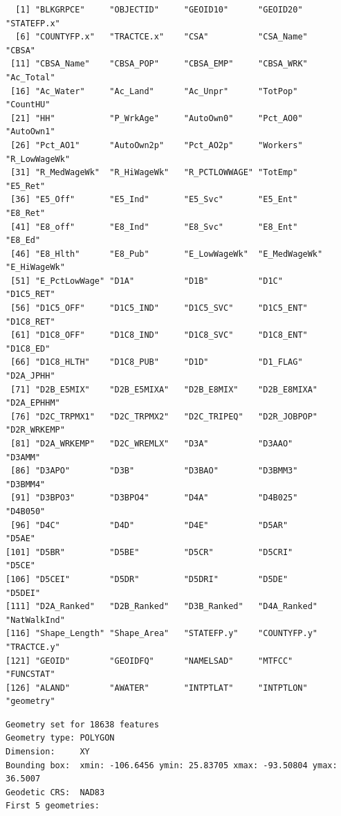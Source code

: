 \documentclass[
  letterpaper,
  DIV=11,
  numbers=noendperiod]{scrartcl}
\newenvironment{Shaded}{\begin{snugshade}}{\end{snugshade}}
\newcommand{\NormalTok}[1]{\textcolor[rgb]{0.00,0.23,0.31}{#1}}
\newcommand{\SpecialCharTok}[1]{\textcolor[rgb]{0.37,0.37,0.37}{#1}}
\begin{document}
\begin{verbatim}
  [1] "BLKGRPCE"     "OBJECTID"     "GEOID10"      "GEOID20"      "STATEFP.x"   
  [6] "COUNTYFP.x"   "TRACTCE.x"    "CSA"          "CSA_Name"     "CBSA"        
 [11] "CBSA_Name"    "CBSA_POP"     "CBSA_EMP"     "CBSA_WRK"     "Ac_Total"    
 [16] "Ac_Water"     "Ac_Land"      "Ac_Unpr"      "TotPop"       "CountHU"     
 [21] "HH"           "P_WrkAge"     "AutoOwn0"     "Pct_AO0"      "AutoOwn1"    
 [26] "Pct_AO1"      "AutoOwn2p"    "Pct_AO2p"     "Workers"      "R_LowWageWk" 
 [31] "R_MedWageWk"  "R_HiWageWk"   "R_PCTLOWWAGE" "TotEmp"       "E5_Ret"      
 [36] "E5_Off"       "E5_Ind"       "E5_Svc"       "E5_Ent"       "E8_Ret"      
 [41] "E8_off"       "E8_Ind"       "E8_Svc"       "E8_Ent"       "E8_Ed"       
 [46] "E8_Hlth"      "E8_Pub"       "E_LowWageWk"  "E_MedWageWk"  "E_HiWageWk"  
 [51] "E_PctLowWage" "D1A"          "D1B"          "D1C"          "D1C5_RET"    
 [56] "D1C5_OFF"     "D1C5_IND"     "D1C5_SVC"     "D1C5_ENT"     "D1C8_RET"    
 [61] "D1C8_OFF"     "D1C8_IND"     "D1C8_SVC"     "D1C8_ENT"     "D1C8_ED"     
 [66] "D1C8_HLTH"    "D1C8_PUB"     "D1D"          "D1_FLAG"      "D2A_JPHH"    
 [71] "D2B_E5MIX"    "D2B_E5MIXA"   "D2B_E8MIX"    "D2B_E8MIXA"   "D2A_EPHHM"   
 [76] "D2C_TRPMX1"   "D2C_TRPMX2"   "D2C_TRIPEQ"   "D2R_JOBPOP"   "D2R_WRKEMP"  
 [81] "D2A_WRKEMP"   "D2C_WREMLX"   "D3A"          "D3AAO"        "D3AMM"       
 [86] "D3APO"        "D3B"          "D3BAO"        "D3BMM3"       "D3BMM4"      
 [91] "D3BPO3"       "D3BPO4"       "D4A"          "D4B025"       "D4B050"      
 [96] "D4C"          "D4D"          "D4E"          "D5AR"         "D5AE"        
[101] "D5BR"         "D5BE"         "D5CR"         "D5CRI"        "D5CE"        
[106] "D5CEI"        "D5DR"         "D5DRI"        "D5DE"         "D5DEI"       
[111] "D2A_Ranked"   "D2B_Ranked"   "D3B_Ranked"   "D4A_Ranked"   "NatWalkInd"  
[116] "Shape_Length" "Shape_Area"   "STATEFP.y"    "COUNTYFP.y"   "TRACTCE.y"   
[121] "GEOID"        "GEOIDFQ"      "NAMELSAD"     "MTFCC"        "FUNCSTAT"    
[126] "ALAND"        "AWATER"       "INTPTLAT"     "INTPTLON"     "geometry"    
\end{verbatim}

\begin{Shaded}
\end{Shaded}

\begin{verbatim}
Geometry set for 18638 features 
Geometry type: POLYGON
Dimension:     XY
Bounding box:  xmin: -106.6456 ymin: 25.83705 xmax: -93.50804 ymax: 36.5007
Geodetic CRS:  NAD83
First 5 geometries:
\end{verbatim}
\end{document}
